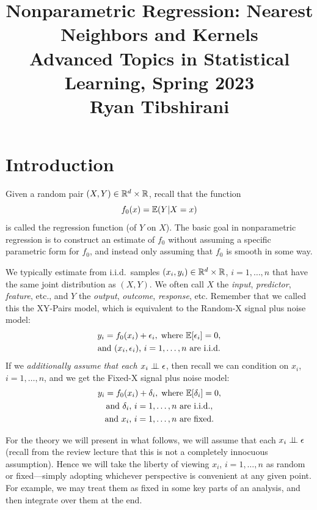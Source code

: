 \documentclass{article}
\title{Nonparametric Regression: Nearest Neighbors and Kernels \\ \smallskip 
\large Advanced Topics in Statistical Learning, Spring 2023 \\ \smallskip
Ryan Tibshirani}
\author{}
\date{}
\begin{document}
\maketitle
\RaggedRight
\vspace{-50pt}

\section{Introduction}

Given a random pair $(X,Y) \in \mathbb{R}^d \times \mathbb{R}$, recall that the function 
\[
 f_0(x) = \mathbb{E}(Y|X=x) 
\]
is called the regression function (of $Y$ on $X$). The basic goal in
nonparametric regression is to construct an estimate \smash{$\hf$} of $f_0$ 
without assuming a specific parametric form for $f_0$, and instead only assuming 
that $f_0$ is smooth in some way.

We typically estimate \smash{$\hf$} from i.i.d.\ samples $(x_i,y_i) \in \mathbb{R}^d
\times \mathbb{R}$, $i=1,\dots,n$ that have the same joint distribution as $(X,Y)$. We 
often call $X$ the \emph{input}, \emph{predictor}, \emph{feature}, etc., and $Y$
the \emph{output}, \emph{outcome}, \emph{response}, etc. Remember that we called
this the XY-Pairs model, which is equivalent to the Random-X signal plus noise
model:  
\begin{gather*}
\label{eq:random_x}
y_i = f_0(x_i) + \epsilon_i, \; \text{where $\mathbb{E}[\epsilon_i] = 0$}, \\
\text{and $(x_i, \epsilon_i)$, $i=1,\dots,n$ are i.i.d.}
\end{gather*} 
If we \emph{additionally assume that each $x_i \perp\!\!\!\perp \epsilon$}, then recall we 
can condition on $x_i$, $i=1,\dots,n$, and we get the Fixed-X signal plus noise
model:  
\begin{gather*}
y_i = f_0(x_i) + \delta_i, \; \text{where $\mathbb{E}[\delta_i] = 0$}, \\
\text{and $\delta_i$, $i=1,\dots,n$ are i.i.d.}, \\  
\text{and $x_i$, $i=1,\dots,n$ are fixed.}   
\end{gather*}

For the theory we will present in what follows, we will assume that each $x_i
\perp\!\!\!\perp \epsilon$ (recall from the review lecture that this is not a completely
innocuous assumption). Hence we will take the liberty of viewing $x_i$,
$i=1,\dots,n$ as random or fixed---simply adopting whichever perspective is
convenient at any given point. For example, we may treat them as fixed in some
key parts of an analysis, and then integrate over them at the end.    
\end{document}
